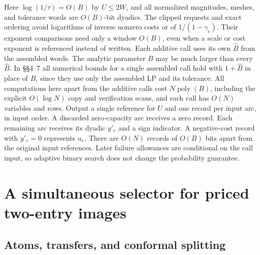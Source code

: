 \documentclass[11pt]{article}
\begin{document}
Here \(\log(1/\tau)=O(B)\) by \(U\le2W\), and all normalized magnitudes, meshes, and tolerance words are \(O(B)\)-bit dyadics. The clipped requests and exact ordering avoid logarithms of inverse nonzero costs or of \(1/(1-\gamma_e)\). Their exponent comparisons need only a window \(O(B)\), even when a scale or cost exponent is referenced instead of written. Each additive call uses its own \(\widehat B\) from the assembled words. The analytic parameter \(B\) may be much larger than every \(\widehat B\). In §§4--7 all numerical bounds for a single assembled call hold with \(1+\widehat B\) in place of \(B\), since they use only the assembled LP and its tolerance. All computations here apart from the additive calls cost \(N\operatorname{poly}(B)\), including the explicit \(O(\log N)\) copy and verification scans, and each call has \(O(N)\) variables and rows. Output a single reference for \(U\) and one record per input arc, in input order. A discarded zero-capacity arc receives a zero record. Each remaining arc receives its dyadic \(y'_e\) and a sign indicator. A negative-cost record with \(y'_e=0\) represents \(u_e\). There are \(O(N)\) records of \(O(B)\) bits apart from the original input references. Later failure allowances are conditional on the call input, so adaptive binary search does not change the probability guarantee.

\hypertarget{a-simultaneous-selector-for-priced-two-entry-images}{%
\section{A simultaneous selector for priced two-entry images}\label{a-simultaneous-selector-for-priced-two-entry-images}}

\hypertarget{atoms-transfers-and-conformal-splitting}{%
\subsection{Atoms, transfers, and conformal splitting}\label{atoms-transfers-and-conformal-splitting}}
\end{document}
